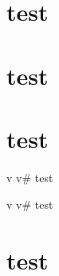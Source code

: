 \documentclass{article}%
\begin{document}
\section{ test
}%
\label{sec:test}%

%
\sectionfont{\color{red}}%
\subsectionfont{\color{red}}%
\subsubsectionfont{\color{red}}%
\section{ test
}%
\label{sec:test}%

%
\sectionfont{\color{cyan}}%
\subsectionfont{\color{cyan}}%
\subsubsectionfont{\color{cyan}}%
\section{ test
}%
\label{sec:test}%
v
%
v\# test


%
v
%
v\# test
%
\sectionfont{\color{orange}}%
\subsectionfont{\color{orange}}%
\subsubsectionfont{\color{orange}}%
\section{ test}%
\label{sec:test}%

%
\end{document}
